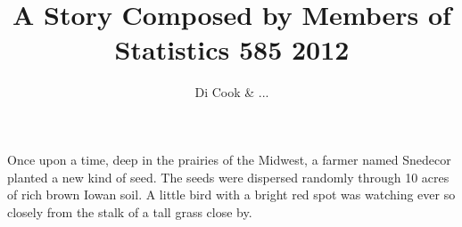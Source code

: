 \documentclass{article}
\begin{document}
\title{A Story Composed by Members of Statistics 585 2012}
\author{Di Cook \& ...}
\maketitle

Once upon a time, deep in the prairies of the Midwest, a farmer named Snedecor planted a new kind of seed. The seeds were dispersed randomly through 10 acres of rich brown Iowan soil. A little bird with a bright red spot was watching ever so closely  from the stalk of a tall grass close by. 
\end{document}
